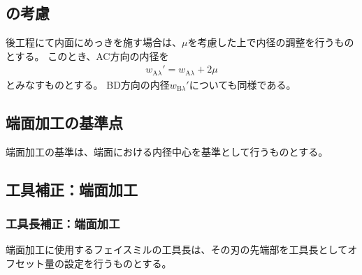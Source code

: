 \subsection{\PlatingThk の考慮}
後工程にて内面にめっきを施す場合は、\PlatingThk$\mu$を考慮した上で内径の調整を行うものとする。
このとき、AC方向の内径を
\begin{align*}
  w_{\mathrm A\lambda}' = w_{\mathrm A\lambda}+2\mu
\end{align*}
とみなすものとする。
BD方向の内径$w_{\mathrm B\lambda}'$についても同様である。



\clearpage


\subsection{端面加工の基準点}
端面加工の基準は、端面における内径中心を基準として行うものとする。


\subsection{工具補正：端面加工}

\subsubsection{工具長補正：端面加工}
端面加工に使用するフェイスミルの工具長は、その刃の先端部を工具長としてオフセット量の設定を行うものとする。

